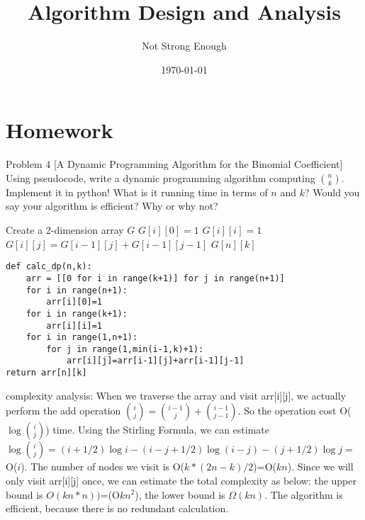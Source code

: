 \documentclass[UTF8, a4paper, linespread=1.5]{article}
\title{Algorithm Design and Analysis}
\date{\today}
\author{Not Strong Enough}
\begin{document}
\maketitle

\section{Homework}
\begin{thm}{Problem 4}{}
	[A Dynamic Programming Algorithm for the Binomial Coefficient] Using pseudocode, 
	write a dynamic programming algorithm computing  $\binom{n}{k}$.  Implement it in python!  What is it running 
	time in terms of $n$ and $k$? Would you say your algorithm is efficient?  Why or why not?
	
\end{thm}
\begin{algorithm}
	\caption{Caluculate Binomial Coefficient Using DP}
	\begin{algorithmic}
		\STATE Create a 2-dimension array $G$
		\STATE $G[i][0]=1$
		\ENDFOR
		\STATE $G[i][i]=1$
		\ENDFOR
		\STATE $G[i][j]=G[i-1][j]+G[i-1][j-1]$
		\ENDFOR
		\ENDFOR
		\RETURN $G[n][k]$
	\end{algorithmic}
\end{algorithm}
\begin{verbatim}
def calc_dp(n,k):
    arr = [[0 for i in range(k+1)] for j in range(n+1)]
    for i in range(n+1):
        arr[i][0]=1
    for i in range(k+1):
        arr[i][i]=1
    for i in range(1,n+1):
        for j in range(1,min(i-1,k)+1):
            arr[i][j]=arr[i-1][j]+arr[i-1][j-1]
return arr[n][k]
\end{verbatim}
complexity analysis: When we traverse the array and visit arr[i][j], we actually perform the add operation $\binom{i}{j}=\binom{i-1}{j}+\binom{i-1}{j-1}$. So the operation cost O($\log\binom{i}{j}$) time. Using the Stirling Formula, we can estimate
$\log\binom{i}{j}=(i+1/2)\log i-(i-j+1/2)\log (i-j)-(j+1/2)\log j =$ O($i$). The number of nodes we visit is O($k*(2n-k)/2$)=O($kn$). Since we will only visit arr[i][j] once, we can estimate the total complexity as below: the upper bound is $O(kn*n))$=(O$kn^2$), the lower bound is $\Omega(kn)$. The algorithm is efficient, because there is no redundant calculation.
\end{document}
